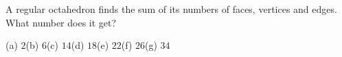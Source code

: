 A regular octahedron finds the sum of its numbers of faces, vertices and edges. What number does it get?

(a) $2$\quad (b) $6$\quad (c) $14$\quad (d) $18$\quad (e) $22$\quad (f) $26$\quad (g) $34$
